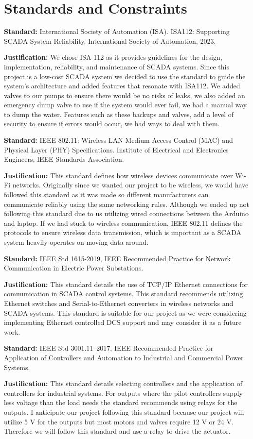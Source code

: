 \documentclass[../main.tex]{subfiles}
\begin{document}
\section{Standards and Constraints}
\label{sec:standards}

\noindent\textbf{Standard:} International Society of Automation (ISA). ISA112: Supporting SCADA System Reliability. International Society of Automation, 2023. 

\noindent\textbf{Justification:} We chose ISA-112 as it provides guidelines for the design, implementation, reliability, and maintenance of SCADA systems. Since this project is a low-cost SCADA system we decided to use the standard to guide the system’s architecture and added features that resonate with ISA112. We added valves to our pumps to ensure there would be no risks of leaks, we also added an emergency dump valve to use if the system would ever fail, we had a manual way to dump the water. Features such as these backups and valves, add a level of security to ensure if errors would occur, we had ways to deal with them.

\noindent\textbf{Standard:} IEEE 802.11: Wireless LAN Medium Access Control (MAC) and Physical Layer (PHY) Specifications. Institute of Electrical and Electronics Engineers, IEEE Standards Association. 

\noindent\textbf{Justification:} This standard defines how wireless devices communicate over Wi-Fi networks. Originally since we wanted our project to be wireless, we would have followed this standard as it was made so different manufacturers can communicate reliably using the same networking rules. Although we ended up not following this standard due to us utilizing wired connections between the Arduino and laptop. If we had stuck to wireless communication, IEEE 802.11 defines the protocols to ensure wireless data transmission, which is important as a SCADA system heavily operates on moving data around.

\noindent\textbf{Standard:} IEEE Std 1615-2019, IEEE Recommended Practice for Network Communication in Electric Power Substations. 

\noindent\textbf{Justification:} This standard details the use of TCP/IP Ethernet connections for communication in SCADA control systems. This standard recommends utilizing Ethernet switches and Serial-to-Ethernet converters in wireless networks and SCADA systems. This standard is suitable for our project as we were considering implementing Ethernet controlled DCS support and may consider it as a future work.

\noindent\textbf{Standard:} IEEE Std 3001.11–2017, IEEE Recommended Practice for Application of Controllers and Automation to Industrial and Commercial Power Systems. 

\noindent\textbf{Justification:} This standard details selecting controllers and the application of controllers for industrial systems. For outputs where the pilot controllers supply less voltage than the load needs the standard recommends using relays for the outputs. I anticipate our project following this standard because our project will utilize 5 V for the outputs but most motors and valves require 12 V or 24 V. Therefore we will follow this standard and use a relay to drive the actuator. 
\end{document}
